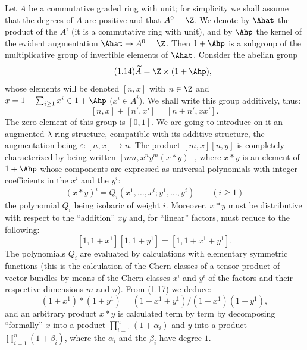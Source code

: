 Let $A$ be a commutative graded ring with unit; for simplicity we shall assume that the degrees of $A$ are positive and that $A^0=\Z$. We denote by $\Ahat$ the product of the $A^i$ (it is a commutative ring with unit), and by $\Ahp$ the kernel of the evident augmentation $\Ahat\to A^0=\Z$. Then $1+\Ahp$ is a subgroup of the multiplicative group of invertible elements of $\Ahat$. Consider the abelian group
\begin{equation}\tag{1.14}
\widetilde A=\Z\times(1+\Ahp),
\end{equation}
whose elements will be denoted $[n,x]$ with $n\in\Z$ and $x=1+\sum_{i\geq 1}x^i\in1+\Ahp$ ($x^i\in A^i$). We shall write this group additively, thus:
\begin{equation}\tag{1.15}
[n,x]+[n',x']=[n+n',xx'].
\end{equation}
The zero element of this group is $[0,1]$. We are going to introduce on it an augmented $\lambda$-ring structure, compatible with its additive structure, the augmentation being $\varepsilon:[n,x]\longrightarrow n$. The product $[m,x][n,y]$ is completely characterized by being written $[mn,x^n y^m(x*y)]$, where $x*y$ is an element of $1+\Ahp$ whose components are expressed as universal polynomials with integer coefficients in the $x^i$ and the $y^i$:
\begin{equation}\tag{1.16}
(x*y)^i=Q_i(x^1,\ldots,x^i;y^1,\ldots,y^i)\qquad (i\geq1)
\end{equation}
%
the
polynomial $Q_i$ being isobaric of weight $i$. Moreover, $x*y$ must be distributive with respect to the ``addition'' $xy$ and, for ``linear'' factors, must reduce to the following:
\begin{equation}\tag{1.17}
[1,1+x^1][1,1+y^1]=[1,1+x^1+y^1].
\end{equation}
The polynomials $Q_i$ are evaluated by calculations with elementary symmetric functions (this is the calculation of the Chern classes of a tensor product of vector bundles by means of the Chern classes $x^i$ and $y^i$ of the factors and their respective dimensions $m$ and $n$). From (1.17) we deduce:
\begin{equation}\tag{1.17 bis}
(1+x^1)*(1+y^1)=(1+x^1+y^1)/(1+x^1)(1+y^1),
\end{equation}
and an arbitrary product $x*y$ is calculated term by term by decomposing ``formally'' $x$ into a product $\prod_{i=1}^n(1+\alpha_i)$ and $y$ into a product $\prod_{i=1}^n(1+\beta_i)$, where the $\alpha_i$ and the $\beta_i$ have degree $1$.

